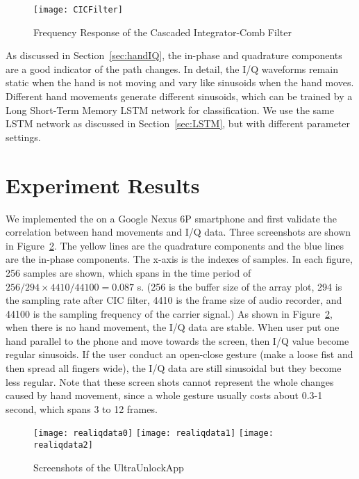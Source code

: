 \begin{figure}[h]
	\centering
	\texttt{[image: CICFilter]}
	\caption{Frequency Response of the Cascaded Integrator-Comb Filter}
	\label{fig:CICFilter}
\end{figure}

As discussed in Section~\ref{sec:handIQ}, the in-phase and quadrature components are a good indicator of the path changes. In detail, the I/Q waveforms remain static when the hand is not moving and vary like sinusoids when the hand moves. Different hand movements generate different sinusoids, which can be trained by a Long Short-Term Memory LSTM network for classification.  We use the same LSTM network as discussed in Section~\ref{sec:LSTM}, but with different parameter settings.

\section{Experiment Results}

We implemented the {\uu} on a Google Nexus 6P smartphone and first validate the correlation between hand movements and I/Q data.
Three screenshots are shown in Figure~\ref{fig:realIQ}. The yellow lines are the quadrature components and the blue lines are the in-phase components. The x-axis is the indexes of samples. In each figure, 256 samples are shown, which spans in the time period of $256/294\times4410/44100 = 0.087$ s. (256 is the buffer size of the array plot, 294 is the sampling rate after CIC filter, 4410 is the frame size of audio recorder, and 44100 is the sampling frequency of the carrier signal.) As shown in Figure~\ref{fig:realIQ}, when there is no hand movement, the I/Q data are stable. When user put one hand parallel to the phone and move towards the screen, then I/Q value become regular sinusoids. If the user conduct an open-close gesture (make a loose fist and then spread all fingers wide), the I/Q data are still sinusoidal but they become less regular. Note that these screen shots cannot represent the whole changes caused by hand movement, since a whole gesture usually costs about 0.3-1 second, which spans 3 to 12 frames.


\begin{figure}[h]
	\centering
	\begin{minipage}{.6\linewidth}
		\texttt{[image: realiqdata0]}
		\vspace{.1in}
		\texttt{[image: realiqdata1]}
		\vspace{.1in}
		\texttt{[image: realiqdata2]}
	\end{minipage}
	\caption{Screenshots of the UltraUnlockApp}	
	\label{fig:realIQ}
\end{figure}


